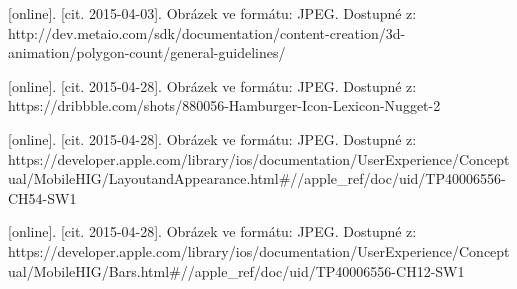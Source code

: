 \documentclass[twoside,12pt]{article}
\begin{document}
\begin{literatura}
{
	[online]. [cit. 2015-04-03]. 
	Obrázek ve formátu: JPEG. Dostupné z: http://dev.metaio.com/sdk/documentation/content-creation/3d-animation/polygon-count/general-guidelines/
}

{
	[online]. [cit. 2015-04-28]. 
	Obrázek ve formátu: JPEG. Dostupné z: https://dribbble.com/shots/880056-Hamburger-Icon-Lexicon-Nugget-2
}

{
	[online]. [cit. 2015-04-28]. 
	Obrázek ve formátu: JPEG. Dostupné z: https://developer.apple.com/library/ios/documentation/UserExperience/Conceptual/MobileHIG/LayoutandAppearance.html\#//apple\_ref/doc/uid/TP40006556-CH54-SW1
}

{
	[online]. [cit. 2015-04-28]. 
	Obrázek ve formátu: JPEG. Dostupné z: https://developer.apple.com/library/ios/documentation/UserExperience/Conceptual/MobileHIG/Bars.html\#//apple\_ref/doc/uid/TP40006556-CH12-SW1
}

%




\end{literatura}
\end{document}
